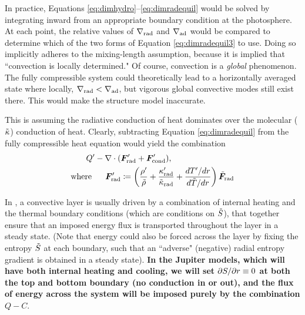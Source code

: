 \documentclass[12pt]{article}
\numberwithin{equation}{section}
\begin{document}
In practice, Equations \eqref{eq:dimhydro}--\eqref{eq:dimradequil} would be solved by integrating inward from an appropriate boundary condition at the photosphere. At each point, the relative values of $\nabla_{\rm rad}$ and $\nabla_{\rm ad}$ would be compared to determine which of the two forms of Equation \eqref{eq:dimradequil3} to use. Doing so implicitly adheres to the mixing-length assumption, because it is implied that ``convection is locally determined." Of course, convection is a \textit{global} phenomenon. The fully compressible system could theoretically lead to a horizontally averaged state where locally, $\nabla_{\rm rad}<\nabla_{\rm ad}$, but vigorous global convective modes still exist there. This would make the structure model inaccurate. 

This is assuming the radiative conduction of heat dominates over the molecular ($\tilde{\kappa}$) conduction of heat. Clearly, subtracting Equation \eqref{eq:dimradequil} from the fully compressible heat equation would yield the combination 
\begin{subequations}
	\begin{align}
		{Q^\prime} - \nabla\cdot(&\bm{F}^\prime_{\rm rad} + \bm{F}^\prime_{\rm cond}),\\
		\text{where}\ \ \ \ \  \bm{F}^\prime_{\rm rad} &\coloneqq \left(\frac{{\rho^\prime}}{\tilde{\rho}} + \frac{\kappa^\prime_{\rm rad}}{\tilde{\kappa}_{\rm rad}} + \frac{d{T^\prime}/dr}{d\tilde{T}/dr}\right)\tilde{\bm{F}}_{\rm rad}
	\end{align}
\end{subequations}



	In {\rayleigh}, a convective layer is usually driven by a combination of internal heating and the thermal boundary conditions (which are conditions on $\tilde{S}$), that together ensure that an imposed energy flux is transported throughout the layer in a steady state. (Note that energy could also be forced across the layer by fixing the entropy $\tilde{S}$ at each boundary, such that an ``adverse" (negative) radial entropy gradient is obtained in a steady state).   \textbf{In the Jupiter models, which will have both internal heating and cooling, we will set $\partial S/\partial r\equiv0$ at both the top and bottom boundary (no conduction in or out), and the flux of energy across the system will be imposed purely by the combination $Q-C$}. 
	
\end{document}
